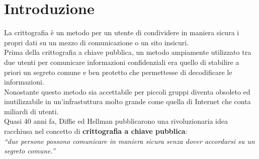 
\chapter{Introduzione}


La crittografia è un metodo per un utente di condividere in maniera sicura i propri dati su un mezzo di comunicazione o un sito insicuri.\\
Prima della crittografia a chiave pubblica, un metodo ampiamente utilizzato tra due utenti per comunicare informazioni confidenziali era quello di stabilire a priori un segreto comune e ben protetto che permettesse di decodificare le informazioni.\\
Nonostante questo metodo sia accettabile per piccoli gruppi diventa obsoleto ed inutilizzabile in un'infrastuttura molto grande come quella di Internet che conta miliardi di utenti.\\

Quasi 40 anni fa, Diffie ed Hellman pubblicarono una rivoluzionaria idea racchiusa nel concetto di \textbf{crittografia a chiave pubblica}:\\
{ \itshape ``due persone possono comunicare in maniera sicura \emph{senza} dover accordarsi su un segreto comune.''}\\
\begin{center}
\end{center}

